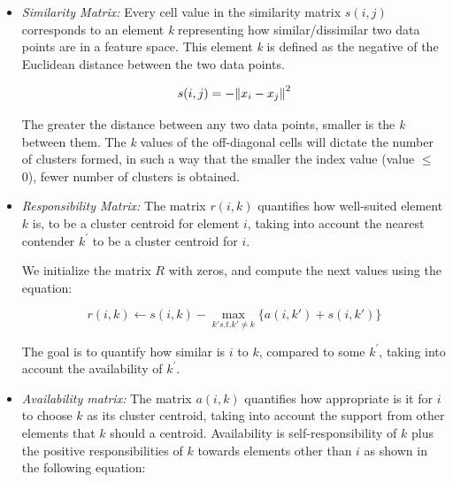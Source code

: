 \begin{itemize}

  \item\textit{Similarity Matrix:}
  Every cell value in the similarity matrix $s(i,j)$ corresponds to an element \textit{k} representing how similar/dissimilar two data points are in a feature space. This element \textit{k} is defined as the negative of the Euclidean distance between the two data points. 
  
  \begin{equation}
      s (i,j) = - \norm{x_i - x_j}^ 2
  \end{equation}
  
  The greater the distance between any two data points, smaller is the \textit{k} between them. The \textit{k} values of the off-diagonal cells will dictate the number of clusters formed, in such a way that the smaller the index value (value	$\leq$0), fewer number of clusters is obtained.
  \item\textit{Responsibility Matrix:} The matrix $r(i , k)$ quantifies how well-suited element $k$ is, to be a cluster centroid for element $i$, taking into account the nearest contender $k^{\prime}$ to be a cluster centroid for $i$.
  
  We initialize the matrix $R$ with zeros, and compute the next values using the equation:

    \begin{equation}
        r(i, k) \leftarrow s(i, k) - \max\limits_{k' s.t. k' \neq k}\{ a(i, k') + s(i, k') \}
    \end{equation}
 
 The goal is to quantify how similar is $i$ to $k$, compared to some $k^{\prime}$, taking into account the availability of $k^{\prime}$.   
    
  \item\textit{Availability matrix:} The matrix $a(i,k)$ quantifies how appropriate is it for $i$ to choose $k$ as its cluster centroid, taking into account the support from other elements that $k$ should a centroid. Availability is self-responsibility of $k$ plus the positive responsibilities of $k$ towards elements other than $i$ as shown in the following equation:
  

\end{itemize}
